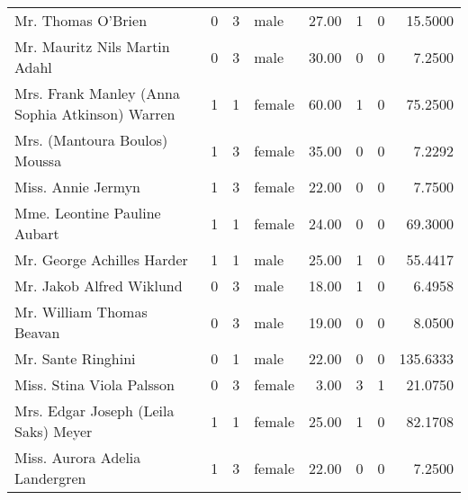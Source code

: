 \begin{tabular}{lrrlrrrr}
Mr. Thomas O'Brien                                 &         0 &       3 &    male &  27.00 &                        1 &                        0 &   15.5000 \\
Mr. Mauritz Nils Martin Adahl                      &         0 &       3 &    male &  30.00 &                        0 &                        0 &    7.2500 \\
Mrs. Frank Manley (Anna Sophia Atkinson) Warren    &         1 &       1 &  female &  60.00 &                        1 &                        0 &   75.2500 \\
Mrs. (Mantoura Boulos) Moussa                      &         1 &       3 &  female &  35.00 &                        0 &                        0 &    7.2292 \\
Miss. Annie Jermyn                                 &         1 &       3 &  female &  22.00 &                        0 &                        0 &    7.7500 \\
Mme. Leontine Pauline Aubart                       &         1 &       1 &  female &  24.00 &                        0 &                        0 &   69.3000 \\
Mr. George Achilles Harder                         &         1 &       1 &    male &  25.00 &                        1 &                        0 &   55.4417 \\
Mr. Jakob Alfred Wiklund                           &         0 &       3 &    male &  18.00 &                        1 &                        0 &    6.4958 \\
Mr. William Thomas Beavan                          &         0 &       3 &    male &  19.00 &                        0 &                        0 &    8.0500 \\
Mr. Sante Ringhini                                 &         0 &       1 &    male &  22.00 &                        0 &                        0 &  135.6333 \\
Miss. Stina Viola Palsson                          &         0 &       3 &  female &   3.00 &                        3 &                        1 &   21.0750 \\
Mrs. Edgar Joseph (Leila Saks) Meyer               &         1 &       1 &  female &  25.00 &                        1 &                        0 &   82.1708 \\
Miss. Aurora Adelia Landergren                     &         1 &       3 &  female &  22.00 &                        0 &                        0 &    7.2500 \\

\end{tabular}
